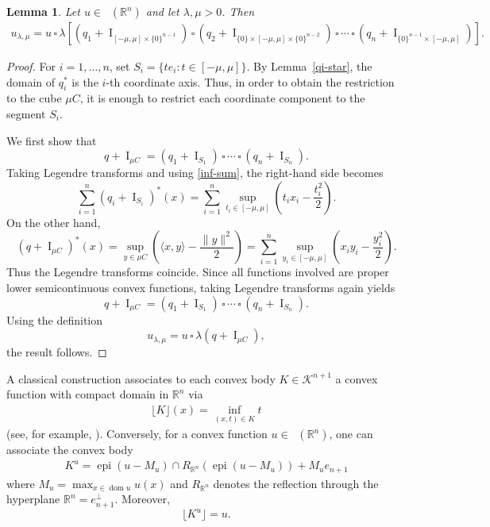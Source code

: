 \documentclass[11pt]{article}
\newtheorem{lema}[teo]{Lemma}
\theoremstyle{definition} %
\DeclareMathOperator{\I}{I}
\DeclareMathOperator{\dom}{dom}
\DeclareMathOperator{\epi}{epi}
\DeclareMathOperator{\LP}{Conv_{lp}}
\begin{document}
\begin{lema}\label{decomposition}
Let $u\in\LP(\mathbb{R}^n)$ and let $\lambda,\mu>0$. Then
\begin{align*}
u_{\lambda,\mu}
= u\,\square\, \lambda \left[
\left(q_1+\I_{[-\mu,\mu]\times \{0\}^{n-1}} \right)
\,\square\,
\left(q_2+\I_{\{0\}\times [-\mu,\mu]\times \{0\}^{n-2}} \right)
\,\square\, \cdots \,\square\,
\left(q_n+\I_{\{0\}^{n-1}\times [-\mu,\mu]} \right)
\right].
\end{align*}
\end{lema}

\begin{proof}
For $i=1,\dots,n$, set
\(
S_i=\{te_i:t\in[-\mu,\mu]\}.
\)
By Lemma~\ref{qi-star}, the  domain of $q_i^*$ is the $i$-th coordinate axis. Thus, in order to obtain the restriction to the cube $\mu C$, it is enough to restrict each coordinate component to the segment $S_i$.


We first show that
\[
q+\I_{\mu C}
=
(q_1+\I_{S_1})\,\square\,\cdots\,\square\,(q_n+\I_{S_n}).
\]
Taking Legendre transforms and using \eqref{inf-sum}, the right-hand side becomes
\[
\sum_{i=1}^n (q_i+\I_{S_i})^*(x)
=
\sum_{i=1}^n \sup_{t_i\in[-\mu,\mu]}
\left(t_i x_i-\frac{t_i^2}{2}\right).
\]
On the other hand,
\[
(q+\I_{\mu C})^*(x)
=
\sup_{y\in\mu C}
\left(\langle x,y\rangle-\frac{\|y\|^2}{2}\right)
=
\sum_{i=1}^n \sup_{y_i\in[-\mu,\mu]}
\left(x_i y_i-\frac{y_i^2}{2}\right).
\]
Thus the Legendre transforms coincide. Since all functions involved are proper lower semicontinuous convex functions, taking Legendre transforms again yields
\[
q+\I_{\mu C}
=
(q_1+\I_{S_1})\,\square\,\cdots\,\square\,(q_n+\I_{S_n}).
\]
Using the definition
\[
u_{\lambda,\mu}
=
u\,\square\,\lambda(q+\I_{\mu C}),
\]
the result follows.
\end{proof}




A classical construction associates to each convex body $K \in \mathcal{K}^{n+1}$ a convex function with compact domain in $\mathbb{R}^n$ via
\begin{align*}
 \lfloor K \rfloor(x)=\inf_{(x,t)\in K}t   
\end{align*}
(see, for example,  \cite{knoerr2024valuations}). Conversely, for a convex function $u \in \LP(\mathbb{R}^n)$, one can associate the convex body
\begin{align}\label{set_func}
    K^u=\epi(u-M_u)\cap R_{\mathbb{R}^n}(\epi(u-M_u))+M_ue_{n+1}
\end{align}
where $M_u=\max_{x\in \dom u}u(x)$ and $R_{\mathbb{R}^n}$ denotes the reflection through the hyperplane $\mathbb{R}^n = e_{n+1}^\perp$. Moreover,
$$\lfloor K^u \rfloor = u.$$
\end{document}
